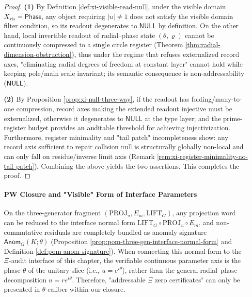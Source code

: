 \begin{proof}
\textbf{(1)} By Definition \ref{def:xi-visible-read-null}, under the visible domain \(X_{\mathrm{vis}}=\mathsf{Phase}\), any object requiring \(|u|\neq 1\) does not satisfy the visible domain filter condition, so its readout degenerates to \(\mathsf{NULL}\) by definition.
On the other hand, local invertible readout of radial–phase state \((\theta,\varrho)\) cannot be continuously compressed to a single circle register (Theorem \ref{thm:radial-dimension-obstruction}), thus under the regime that refuses externalized record axes, "eliminating radial degrees of freedom at constant layer" cannot hold while keeping pole/main scale invariant; its semantic consequence is non-addressability (\(\mathsf{NULL}\)).
\par
\textbf{(2)} By Proposition \ref{prop:xi-null-three-way}, if the readout has folding/many-to-one compression, record axes making the extended readout injective must be externalized, otherwise it degenerates to \(\mathsf{NULL}\) at the type layer; and the prime-register budget provides an auditable threshold for achieving injectivization.
Furthermore, register minimality and "tail patch" incompleteness show: any record axis sufficient to repair collision null is structurally globally non-local and can only fall on residue/inverse limit axis (Remark \ref{rem:xi-register-minimality-no-tail-patch}).
Combining the above yields the two assertions. This completes the proof.
\end{proof}

\paragraph{\(\mathbf{PW}\) Closure and "Visible" Form of Interface Parameters}
On the three-generator fragment \((\mathrm{PROJ}_u,E_m,\mathrm{LIFT}_G)\), any projection word can be reduced to the interface normal form \(\mathrm{LIFT}_G\circ\mathrm{PROJ}_u\circ E_m\), and non-commutative residuals are completely bundled as anomaly signature \(\mathsf{Anom}_G(K;\theta)\) (Proposition \ref{prop:pom-three-gen-interface-normal-form} and Definition \ref{def:pom-anom-signature}).
When connecting this normal form to the \(\Xi\)-audit interface of this chapter, the verifiable continuous parameter axis is the phase \(\theta\) of the unitary slice (i.e., \(u=e^{i\theta}\)), rather than the general radial–phase decomposition \(u=re^{i\theta}\).
Therefore, "addressable \(\Xi\) zero certificates" can only be presented in \(\theta\)-caliber within our closure.

